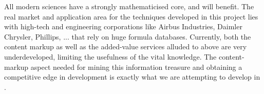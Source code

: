 All modern sciences have a strongly mathematicised core, and will benefit. The
real market and application area for the techniques developed in this project lies
with high-tech and engineering corporations like Airbus Industries, Daimler
Chrysler, Phillips, ... that rely on huge formula databases.  Currently, both the
content markup as well as the added-value services alluded to above are very
underdeveloped, limiting the usefulness of the vital knowledge. The content-markup
aspect needed for mining this information treasure and obtaining a competitive
edge in development is exactly what we are attempting to develop in {\omdoc}.

